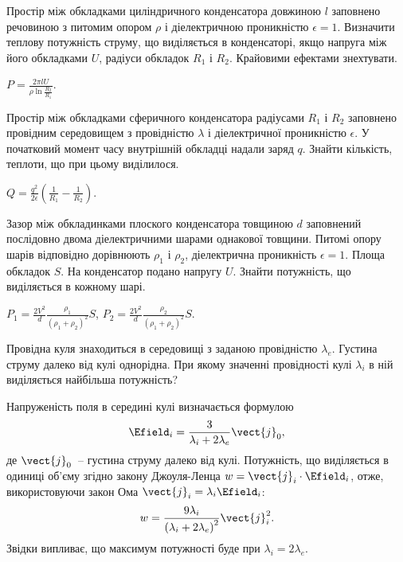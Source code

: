 \begin{problem}%
Простір між обкладками циліндричного конденсатора довжиною $l$ заповнено речовиною з питомим опором $\rho$ і діелектричною проникністю $\epsilon = 1$. Визначити теплову потужність струму, що виділяється в конденсаторі, якщо напруга між його обкладками $U$, радіуси обкладок $R_1$ і $R_2$. Крайовими ефектами знехтувати.
\begin{solution}
	$P = \frac{2\pi l U}{\rho\ln\frac{R_2}{R_1}}$.
\end{solution}
\end{problem}

\begin{problem}%
Простір між обкладками сферичного конденсатора радіусами $R_1$ і $R_2$ заповнено провідним середовищем з провідністю $\lambda$ і діелектричної проникністю $\epsilon$. У початковий момент часу внутрішній обкладці надали заряд $q$. Знайти кількість, теплоти, що при цьому виділилося.
\begin{solution}
	$Q = \frac{q^2}{2\epsilon}\left( \frac{1}{R_1} - \frac{1}{R_2}\right) $.
\end{solution}
\end{problem}

\begin{problem}
Зазор між обкладинками плоского конденсатора товщиною $d$ заповнений послідовно двома діелектричними шарами однакової товщини. Питомі опору шарів відповідно дорівнюють $\rho_1$ і $\rho_2$, діелектрична проникність $\epsilon = 1$. Площа обкладок $S$. На конденсатор подано напругу $U$. Знайти потужність, що виділяється в кожному шарі.
\begin{solution}
	$P_1  = \frac{2V^2}{d} \frac{\rho_1}{(\rho_1 + \rho_2)^2}S$, $P_2  = \frac{2V^2}{d} \frac{\rho_2}{(\rho_1 + \rho_2)^2}S$.
\end{solution}
\end{problem}

\begin{problem} %
Провідна куля знаходиться в середовищі з заданою провідністю $\lambda_e$. Густина струму далеко від кулі однорідна. При якому значенні провідності кулі $\lambda_i$ в ній виділяється найбільша потужність?
\begin{solution}
	Напруженість поля в середині кулі визначається формулою
	\[
		\Efield_i = \frac{3}{\lambda_i + 2\lambda_e} \vect{j}_0,
	\]
	де $\vect{j}_0$~-- густина струму далеко від кулі.
	Потужність, що виділяється в одиниці об'єму згідно закону Джоуля-Ленца $w = \vect{j}_i\cdot\Efield_i$, отже, використовуючи закон Ома $ \vect{j}_i = \lambda_i\Efield_i$:
	\[
		w = \frac{9\lambda_i}{\left( \lambda_i + 2\lambda_e\right)^2} \vect{j}_i^2.
	\]
	Звідки випливає, що максимум потужності буде при $\lambda_i = 2\lambda_e$.
\end{solution}
\end{problem}

